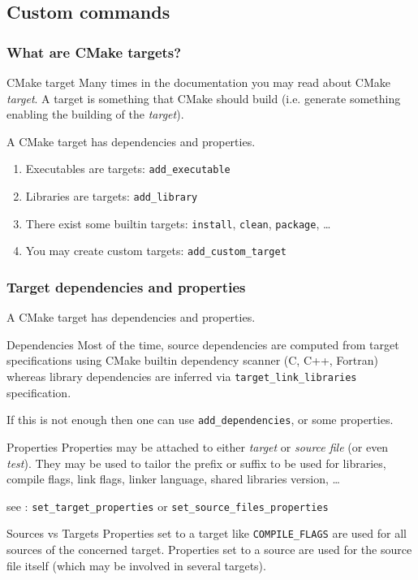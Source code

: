 \documentclass[compress,slidestop,table,usepdftitle=false
              ]
               {beamer}
\newcommand{\fname}[1]{\texttt{#1}}
\begin{document}
\subsection{Custom commands}
\begin{frame}[fragile]
\frametitle{What are CMake targets?}
\begin{block}{CMake target}
Many times in the documentation you may read about CMake \emph{target}.
A target is something that CMake should build (i.e. generate something
enabling the building of the \emph{target}).

A CMake target has \alert{dependencies} and \alert{properties}.
\end{block}
\begin{enumerate}
\item Executables are targets: \lstinline!add_executable!
\item Libraries are targets: \lstinline!add_library!
\item There exist some builtin targets: \fname{install}, \fname{clean}, \fname{package}, \ldots
\item You may create custom targets: \lstinline!add_custom_target!
\end{enumerate}
\end{frame}

\begin{frame}
\frametitle{Target dependencies and properties}
A CMake target has \alert{dependencies} and \alert{properties}.
\begin{block}{Dependencies}
Most of the time, source dependencies are computed from target specifications
using CMake builtin dependency scanner (C, C++, Fortran)
whereas library dependencies
are inferred via \lstinline!target_link_libraries! specification.
\end{block}
If this is not enough then one can use \lstinline!add_dependencies!,
or some properties.
\begin{block}{Properties}
Properties may be attached to either \emph{target} or \emph{source file}
(or even \emph{test}).
They may be used to tailor the prefix or suffix to be used for libraries,
compile flags, link flags, linker language, shared libraries version,
\ldots
\end{block}
\vspace*{-0.3cm}
see : \lstinline!set_target_properties! or \lstinline!set_source_files_properties!
\vspace*{-0.3cm}
\begin{alertblock}{Sources vs Targets}
Properties set to a target like \lstinline!COMPILE_FLAGS! are used
for all sources of the concerned target. Properties set to a source
are used for the source file itself (which may be involved in several targets).
\end{alertblock}
\end{frame}
\end{document}
